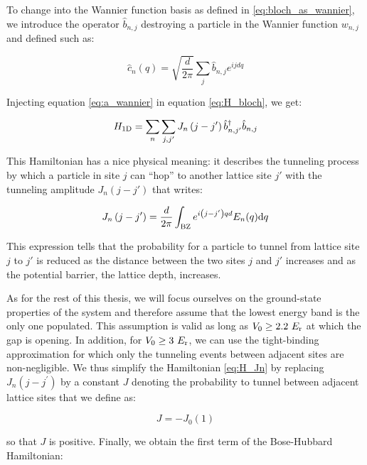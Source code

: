 \noindent To change into the Wannier function basis as defined in \ref{eq:bloch_as_wannier}, we introduce the operator $\hat{b}_{n,j}$ destroying a particle in the Wannier function $w_{n,j}$ and defined such as:

\begin{equation}
    \hat{c}_{n}(q)=\sqrt{\frac{d}{2 \pi}} \sum_{j} \hat{b}_{n, j} e^{i j d q}
    \label{eq:a_wannier}
\end{equation}

\noindent Injecting equation \ref{eq:a_wannier} in equation \ref{eq:H_bloch}, we get:

\begin{equation}
    H_{\rm{1D}}=\sum_{n} \sum_{j, j^{\prime}} J_{n}\left(j-j^{\prime}\right) \hat{b}_{n, j^{\prime}}^{\dagger} \hat{b}_{n,j}
    \label{eq:H_Jn}
\end{equation}

\noindent This Hamiltonian has a nice physical meaning: it describes the tunneling process by which a particle in site $j$ can ``hop'' to another lattice site $j'$ with the tunneling amplitude $J_n (j-j')$ that writes:

\begin{equation}
    J_{n}\left(j-j^{\prime}\right)=\frac{d}{2 \pi} \int_{\rm{BZ}} e^{i\left(j-j^{\prime}\right) q d} E_{n}(q) \mathrm{d} q
\end{equation}

\noindent This expression tells that the probability for a particle to tunnel from lattice site $j$ to $j'$ is reduced as the distance between the two sites $j$ and $j'$ increases and as the potential barrier, \ie the lattice depth, increases.

As for the rest of this thesis, we will focus ourselves on the ground-state properties of the system and therefore assume that the lowest energy band is the only one populated. This assumption is valid as long as $V_0 \geq 2.2 \ E_{\rm{r}}$ at which the gap is opening. In addition, for $V_0 \geq 3 \ E_{\rm{r}}$, we can use the tight-binding approximation for which only the tunneling events between adjacent sites are non-negligible. We thus simplify the Hamiltonian \ref{eq:H_Jn} by replacing  $J_{n}\left(j-j^{\prime}\right)$ by a constant $J$ denoting the probability to tunnel between adjacent lattice sites that we define as:

\begin{equation}
    J=-J_0(1)
\end{equation}

\noindent so that $J$ is positive. Finally, we obtain the first term of the Bose-Hubbard Hamiltonian:


